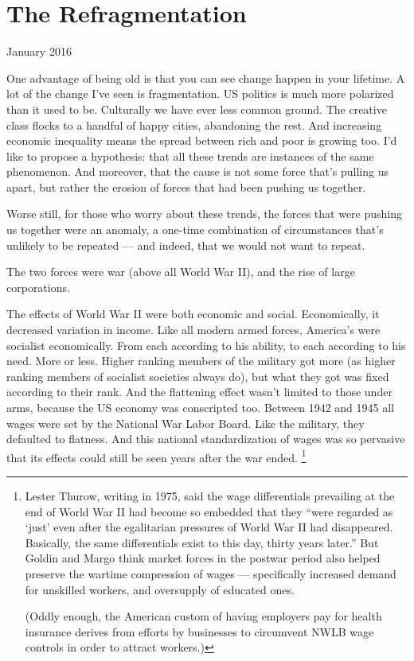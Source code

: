 \chapter{The Refragmentation}

January 2016

One advantage of being old is that you can see change happen in your
lifetime. A lot of the change I've seen is fragmentation. US politics is
much more polarized than it used to be. Culturally we have ever less
common ground. The creative class flocks to a handful of happy cities,
abandoning the rest. And increasing economic inequality means the spread
between rich and poor is growing too. I'd like to propose a hypothesis:
that all these trends are instances of the same phenomenon. And
moreover, that the cause is not some force that's pulling us apart, but
rather the erosion of forces that had been pushing us together.

Worse still, for those who worry about these trends, the forces that
were pushing us together were an anomaly, a one-time combination of
circumstances that's unlikely to be repeated --- and indeed, that we
would not want to repeat.

The two forces were war (above all World War II), and the rise of large
corporations.

The effects of World War II were both economic and social. Economically,
it decreased variation in income. Like all modern armed forces,
America's were socialist economically. From each according to his
ability, to each according to his need. More or less. Higher ranking
members of the military got more (as higher ranking members of socialist
societies always do), but what they got was fixed according to their
rank. And the flattening effect wasn't limited to those under arms,
because the US economy was conscripted too. Between 1942 and 1945 all
wages were set by the National War Labor Board. Like the military, they
defaulted to flatness. And this national standardization of wages was so
pervasive that its effects could still be seen years after the war
ended. \footnote{Lester Thurow, writing in 1975, said the wage differentials
prevailing at the end of World War II had become so embedded that they
``were regarded as `just' even after the egalitarian pressures of World
War II had disappeared. Basically, the same differentials exist to this
day, thirty years later.'' But Goldin and Margo think market forces in
the postwar period also helped preserve the wartime compression of wages
--- specifically increased demand for unskilled workers, and oversupply
of educated ones.

(Oddly enough, the American custom of having employers pay for health
insurance derives from efforts by businesses to circumvent NWLB wage
controls in order to attract workers.)}

